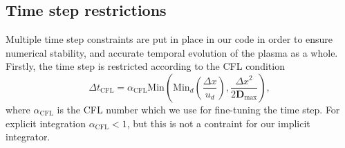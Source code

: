 \documentclass[3p]{elsarticle}
\begin{document}

  

\subsection{Time step restrictions}
Multiple time step constraints are put in place in our code in order to ensure numerical stability, and accurate temporal evolution of the plasma as a whole. Firstly, the time step is restricted according to the CFL condition
\begin{equation}
  \Delta t_{\text{CFL}} = \alpha_{\text{CFL}}\text{Min}\left(\text{Min}_d\left(\frac{\Delta x}{u_d}\right), \frac{\Delta x^2}{2\bm{D}_{\text{max}}}\right),
\end{equation}
where $\alpha_{\text{CFL}}$ is the CFL number which we use for fine-tuning the time step. For explicit integration $\alpha_{\text{CFL}} < 1$, but this is not a contraint for our implicit integrator. 
\end{document}
